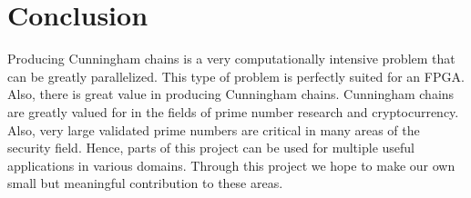 \documentclass[journal]{IEEEtran}
\begin{document}
\section{Conclusion}
Producing Cunningham chains is a very computationally intensive problem that can be greatly parallelized. This type of problem is perfectly suited for an FPGA. Also, there is great value in producing Cunningham chains. Cunningham chains are greatly valued for in the fields of prime number research and cryptocurrency. Also, very large validated prime numbers are critical in many areas of the security field. Hence, parts of this project can be used for multiple useful applications in various domains. Through this project we hope to make our own small but meaningful contribution to these areas.


%



\end{document}
